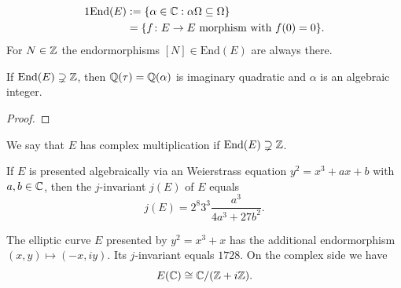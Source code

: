 \documentclass{beamer}
\begin{document}
\begin{frame}
  \begin{alignat*}1
    \mathrm{End}(E) &:= \{\alpha\in \IC : \alpha \Omega\subset
    \Omega\}\\
    &= \{f\colon E\rightarrow E \text{ morphism with
    }f(0)=0\}.    
  \end{alignat*}
  For $N\in{\mathbb{Z}}$ the endormorphisms $[N] \in \mathrm{End}(E)$ are
  always there.
  
  \begin{lemma}
    If $\mathrm{End}(E) \supsetneq {\mathbb{Z}}$, then
    ${\mathbb{Q}}(\tau)={\mathbb{Q}}(\alpha)$
    is imaginary
    quadratic and $\alpha$ is an algebraic integer. 
  \end{lemma}
  \begin{proof}
    \bigskip\bigskip\bigskip\bigskip\bigskip\bigskip\bigskip
  \end{proof}
\end{frame}

\begin{frame}
  \begin{definition}
    We say that $E$ has \alert{complex multiplication} if
    $\mathrm{End}(E)\supsetneq {\mathbb{Z}}$. 
  \end{definition}

  \begin{definition}
    If $E$ is presented algebraically via an Weierstrass equation $y^2 =
    x^3+ax+b$ with $a,b\in{\mathbb{C}}$, then the \alert{$j$-invariant} $j(E)$ of $E$ equals
    \begin{equation*}
      j(E) = 2^8 3^3 \frac{a^3}{4a^3+27b^2}. 
    \end{equation*}  
  \end{definition}

  \begin{example}
    The elliptic curve $E$ presented by $y^2=x^3+x$ has the additional
    endormorphism
    $(x,y)\mapsto (-x, i y)$. Its $j$-invariant equals $1728$. On the
    complex side we have $$E({\mathbb{C}})\cong {\mathbb{C}}/({\mathbb{Z}}+i
    {\mathbb{Z}}).$$
  \end{example}
\end{frame}
\end{document}
